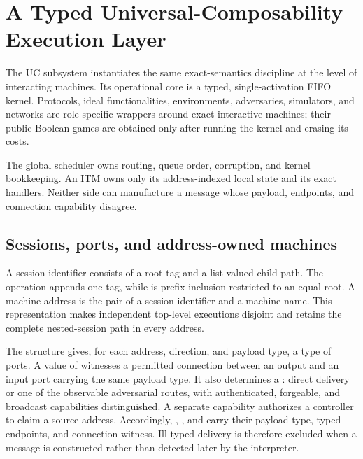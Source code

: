 \section{A Typed Universal-Composability Execution Layer}
\label{sec:uc}

The UC subsystem instantiates the same exact-semantics discipline at the level
of interacting machines.  Its operational core is a typed, single-activation
FIFO kernel.  Protocols, ideal functionalities, environments, adversaries,
simulators, and networks are role-specific wrappers around exact interactive
machines; their public Boolean games are obtained only after running the
kernel and erasing its costs.

\begin{designprinciple}
The global scheduler owns routing, queue order, corruption, and kernel
bookkeeping.  An ITM owns only its address-indexed local state and its exact
handlers.  Neither side can manufacture a message whose payload, endpoints,
and connection capability disagree.
\end{designprinciple}

\subsection{Sessions, ports, and address-owned machines}

A session identifier  consists of a root tag and a list-valued child
path.  The operation  appends one tag, while
 is prefix inclusion restricted to an equal root.  A
machine address is the pair of a session identifier and a machine name.  This
representation makes independent top-level executions disjoint and retains
the complete nested-session path in every address.

The structure  gives, for each address, direction, and payload
type, a type of ports.  A value of  witnesses a permitted
connection between an output and an input port carrying the same payload
type.  It also determines a : direct delivery or one of
the observable adversarial routes, with authenticated, forgeable, and
broadcast capabilities distinguished.  A separate 
capability authorizes a controller to claim a source address.  Accordingly,
, , and  carry their payload type,
typed endpoints, and connection witness.  Ill-typed delivery is therefore
excluded when a message is constructed rather than detected later by the
interpreter.

